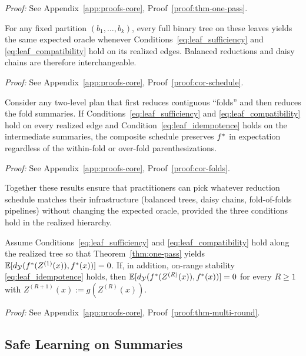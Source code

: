 \noindent\textit{Proof:} See Appendix~\ref{app:proofs-core}, Proof~\ref{proof:thm-one-pass}.

\begin{corollary}\label{cor:schedule}
For any fixed partition $(b_1, \ldots, b_k)$, every full binary tree on these leaves yields the same expected oracle whenever Conditions~\eqref{eq:leaf_sufficiency} and \eqref{eq:leaf_compatibility} hold on its realized edges. Balanced reductions and daisy chains are therefore interchangeable.
\end{corollary}

\noindent\textit{Proof:} See Appendix~\ref{app:proofs-core}, Proof~\ref{proof:cor-schedule}.

\begin{corollary}\label{cor:folds}
Consider any two-level plan that first reduces contiguous ``folds'' and then reduces the fold summaries. If Conditions~\eqref{eq:leaf_sufficiency} and \eqref{eq:leaf_compatibility} hold on every realized edge and Condition~\eqref{eq:leaf_idempotence} holds on the intermediate summaries, the composite schedule preserves $f^{\ast}$ in expectation regardless of the within-fold or over-fold parenthesizations.
\end{corollary}

\noindent\textit{Proof:} See Appendix~\ref{app:proofs-core}, Proof~\ref{proof:cor-folds}.

Together these results ensure that practitioners can pick whatever reduction schedule matches their infrastructure (balanced trees, daisy chains, fold-of-folds pipelines) without changing the expected oracle, provided the three conditions hold in the realized hierarchy.

\begin{theorem}\label{thm:multi-round}
Assume Conditions~\eqref{eq:leaf_sufficiency} and \eqref{eq:leaf_compatibility} hold along the realized tree so that Theorem~\ref{thm:one-pass} yields $\mathbb{E}[d_{\mathcal{Y}}(f^{\ast}(Z^{(1)}(x)), f^{\ast}(x))] = 0$. If, in addition, on-range stability \eqref{eq:leaf_idempotence} holds, then $\mathbb{E}[d_{\mathcal{Y}}(f^{\ast}(Z^{(R)}(x)), f^{\ast}(x))] = 0$ for every $R \geq 1$ with $Z^{(R+1)}(x) := g(Z^{(R)}(x))$.
\end{theorem}

\noindent\textit{Proof:} See Appendix~\ref{app:proofs-core}, Proof~\ref{proof:thm-multi-round}.

\subsection{Safe Learning on Summaries}\label{sec:exist-learn-transport}

